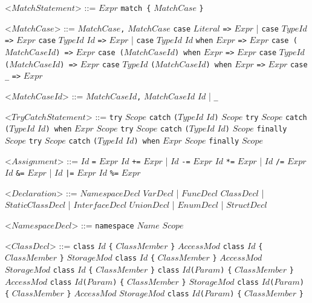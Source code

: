 \documentclass{article}
\newcommand{\gtext}[1]{<$#1$>}
\newcommand{\glit}[1]{\texttt{#1}}
\begin{document}
\begin{grammar}
	\newpage	
	
	\gtext{MatchStatement} ::= $Expr$ \glit{match \{} $MatchCase$ \glit{\}} 
	
	\gtext{MatchCase} ::= $MatchCase$\glit{,} $MatchCase$
	\alt \glit{case} $Literal$ \glit{=>} $Expr$ | \glit{case} $TypeId$ \glit{=>} $Expr$ 
	\alt \glit{case} $TypeId$ $Id$ \glit{=>} $Expr$ | \glit{case} $TypeId$ $Id$ \glit{when} $Expr$ \glit{=>} $Expr$ 
	\alt \glit{case (}$MatchCaseId$\glit{) =>} $Expr$
	\alt \glit{case (}$MatchCaseId$\glit{) when} $Expr$ \glit{=>} $Expr$ 
	\alt \glit{case} $TypeId$ \glit{(}$MatchCaseId$\glit{) =>} $Expr$
	\alt \glit{case} $TypeId$ \glit{(}$MatchCaseId$\glit{) when} $Expr$ \glit{=>} $Expr$ 
	\alt \glit{case} \glit{_} \glit{=>} $Expr$
	
	\gtext{MatchCaseId} ::= $MatchCaseId$\glit{,} $MatchCaseId$
	\alt $Id$ | \glit{_}

	\gtext{TryCatchStatement} ::= \glit{try} $Scope$ \glit{catch} \glit{(}$TypeId$ $Id$\glit{)} $Scope$
	\alt \glit{try} $Scope$ \glit{catch} \glit{(}$TypeId$ $Id$\glit{) when} $Expr$ $Scope$  
	\alt \glit{try} $Scope$ \glit{catch} \glit{(}$TypeId$ $Id$\glit{)} $Scope$ \glit{finally} $Scope$
	\alt \glit{try} $Scope$ \glit{catch} \glit{(}$TypeId$ $Id$\glit{) when} $Expr$ $Scope$ \glit{finally} $Scope$

	\gtext{Assignment} ::= $Id$ \glit{=} $Expr$
	\alt $Id$ \glit{+=} $Expr$ | $Id$ \glit{-=} $Expr$
	\alt $Id$ \glit{*=} $Expr$ | $Id$ \glit{/=} $Expr$
	\alt $Id$ \glit{\&=} $Expr$ | $Id$ \glit{|=} $Expr$
	\alt $Id$ \glit{\%=} $Expr$
	
	\gtext{Declaration} ::=  $NamespaceDecl$
	\alt $VarDecl$ | $FuncDecl$ %
	\alt $ClassDecl$ | $StaticClassDecl$ |  $InterfaceDecl$ %
	\alt $UnionDecl$ | $EnumDecl$ | $StructDecl$ %
	
	\gtext{NamespaceDecl} ::= \glit{namespace} $Name$ $Scope$
	
	\gtext{ClassDecl} ::= \glit{class} $Id$ \glit{\{} $ClassMember$ \glit{\}}
	\alt $AccessMod$ \glit{class} $Id$ \glit{\{} $ClassMember$ \glit{\}}
	\alt $StorageMod$ \glit{class} $Id$ \glit{\{} $ClassMember$ \glit{\}}
	\alt $AccessMod$ $StorageMod$ \glit{class} $Id$ \glit{\{} $ClassMember$ \glit{\}}
	\alt \glit{class} $Id$\glit{(}$Param$\glit{)} \glit{\{} $ClassMember$ \glit{\}}
	\alt $AccessMod$ \glit{class} $Id$\glit{(}$Param$\glit{)} \glit{\{} $ClassMember$ \glit{\}}
	\alt $StorageMod$ \glit{class} $Id$\glit{(}$Param$\glit{)} \glit{\{} $ClassMember$ \glit{\}}
	\alt $AccessMod$ $StorageMod$ \glit{class} $Id$\glit{(}$Param$\glit{)} \glit{\{} $ClassMember$ \glit{\}}
	

\end{grammar}
\end{document}
